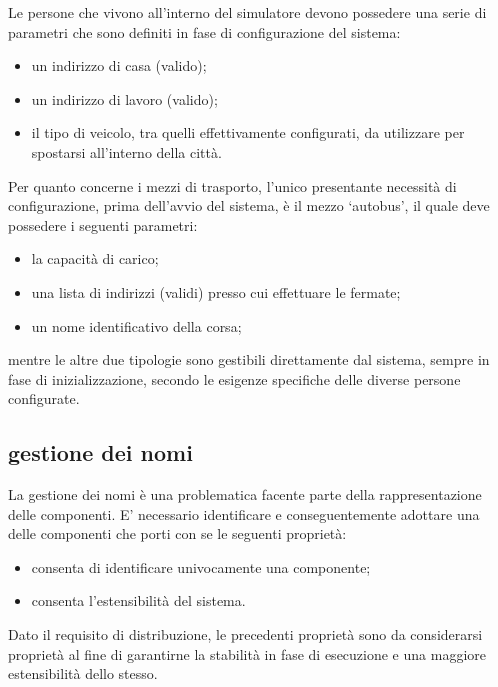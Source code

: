 Le persone che vivono all'interno del simulatore devono possedere una serie di parametri che sono definiti in fase di configurazione del sistema:

\begin{itemize}
\item{un indirizzo di casa (valido);}
\item{un indirizzo di lavoro (valido);}
\item{il tipo di veicolo, tra quelli effettivamente configurati, da utilizzare per spostarsi all'interno della città.}
\end{itemize}

Per quanto concerne i mezzi di trasporto, l'unico presentante necessità di configurazione, prima dell'avvio del sistema, è il mezzo `autobus', il quale deve possedere i seguenti parametri:

\begin{itemize}
\item{la capacità di carico;}
\item{una lista di indirizzi (validi) presso cui effettuare le fermate;}
\item{un nome identificativo della corsa;}
\end{itemize}

mentre le altre due tipologie sono gestibili direttamente dal sistema, sempre in fase di inizializzazione, secondo le esigenze specifiche delle diverse persone configurate.

\subsection*{gestione dei nomi}
\label{problematiche_gestione_dei_nomi}
La gestione dei nomi è una problematica facente parte della rappresentazione delle componenti. E' necessario identificare e conseguentemente adottare una  delle componenti che porti con se le seguenti proprietà:

\begin{itemize}
\item{consenta di identificare univocamente una componente;}
\item{consenta l'estensibilità del sistema.}
\end{itemize}

Dato il requisito di distribuzione, le precedenti proprietà sono da considerarsi proprietà  al fine di garantirne la stabilità in fase di esecuzione e una maggiore estensibilità dello stesso.

